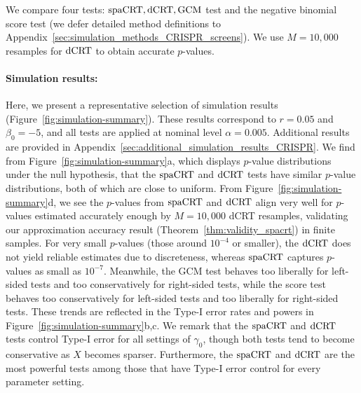 \documentclass[12pt]{article}
\theoremstyle{definition}
\newcommand{\srx}{X}									%
\newcommand{\dCRT}{\textnormal{dCRT}} 					%
\newcommand{\GCM}{\textnormal{GCM}}						%
\newcommand{\spacrt}{\textnormal{spaCRT}}               %
\begin{document}
  
  We compare four tests: $\spacrt,\dCRT,\GCM$ test and the negative binomial score test (we defer detailed method definitions to Appendix~\ref{sec:simulation_methods_CRISPR_screens}). We use $M=10,000$ resamples for $\dCRT$ to obtain accurate $p$-values.  
  
  \paragraph{Simulation results:}
  
  Here, we present a representative selection of simulation results (Figure~\ref{fig:simulation-summary}). These results correspond to $r = 0.05$ and $\beta_0 = -5$, and all tests are applied at nominal level $\alpha = 0.005$. Additional results are provided in Appendix~\ref{sec:additional_simulation_results_CRISPR}. We find from Figure~\ref{fig:simulation-summary}a, which displays $p$-value distributions under the null hypothesis, that the $\spacrt$ and $\dCRT$ tests have similar $p$-value distributions, both of which are close to uniform. From Figure~\ref{fig:simulation-summary}d, we see the $p$-values from $\spacrt$ and $\dCRT$ align very well for $p$-values estimated accurately enough by $M = 10,000$ dCRT resamples, validating our approximation accuracy result (Theorem~\ref{thm:validity_spacrt}) in finite samples. For very small $p$-values (those around $10^{-4}$ or smaller), the $\dCRT$ does not yield reliable estimates due to discreteness, whereas $\spacrt$ captures $p$-values as small as $10^{-7}$. Meanwhile, the GCM test behaves too liberally for left-sided tests and too conservatively for right-sided tests, while the score test behaves too conservatively for left-sided tests and too liberally for right-sided tests. These trends are reflected in the Type-I error rates and powers in Figure~\ref{fig:simulation-summary}b,c. We remark that the $\spacrt$ and $\dCRT$ tests control Type-I error for all settings of $\gamma_0$, though both tests tend to become conservative as $\srx$ becomes sparser. Furthermore, the $\spacrt$ and $\dCRT$ are the most powerful tests among those that have Type-I error control for every parameter setting.
\end{document}
